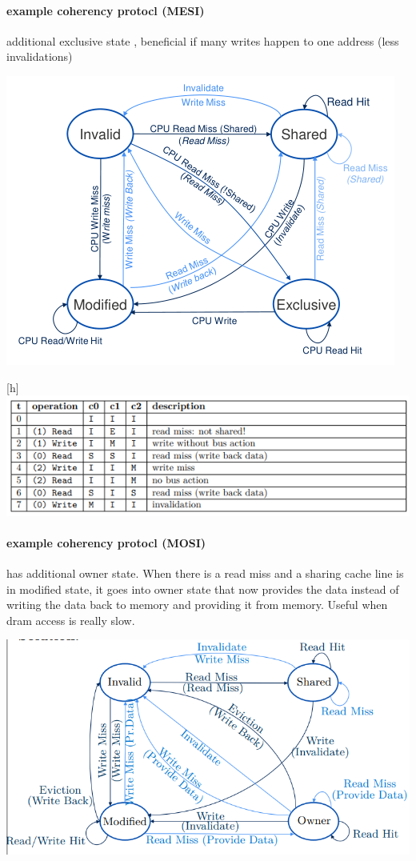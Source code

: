 \documentclass[fontsize=8pt]{scrartcl}
\begin{document}
\begin{multicols*}{4}
\paragraph{example coherency protocl (MESI)} additional exclusive state , beneficial if many writes happen to one address (less invalidations)

\begin{center}
  \includegraphics[width=0.8\linewidth]{img/MESIStates.png}
  \label{fig:mesistates}
\end{center}


\begin{center}[h]
  \centering
  \includegraphics[width=0.8\linewidth]{img/MESIExercise.png}
  \label{fig:mesiexercise}
\end{center}


\paragraph{example coherency protocl (MOSI)} has additional owner state. When there is a read miss and a sharing cache line is in modified state, it goes into owner state that now provides the data instead of writing the data back to memory and providing it from memory. Useful when dram access is really slow.
\begin{center}
  \includegraphics[width=0.8\linewidth]{img/MOSI.png}
  \label{fig:mosi}
\end{center}


\end{multicols*}
\end{document}

